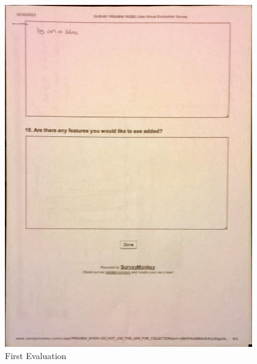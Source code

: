 \begin{figure}[h!]
    \centering
    \includegraphics[width=0.95\textwidth]{images/user_eval/user_eval_8.jpg}
    \caption{First Evaluation}
\end{figure}

